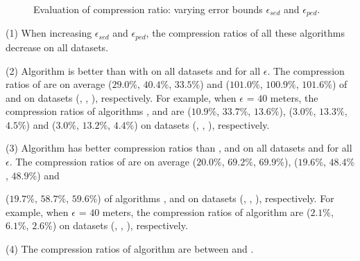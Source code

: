 {\begin{figure}[tb!]
	\caption{\small Evaluation of compression ratio: varying error bounds $\epsilon_{sed}$ and $\epsilon_{ped}$.}
	\label{fig:compression-ratio}
\end{figure}


\ni (1) When increasing $\epsilon_{sed}$ and $\epsilon_{ped}$, the compression ratios of all these algorithms decrease on all datasets.

\ni (2) Algorithm \citt is better than  with \grts on all datasets and for all $\epsilon$.
The compression ratios of \citt are on average {($29.0\%$, $40.4\%$, $33.5\%$) and ($101.0\%$, $100.9\%$, $101.6\%$)} of \ldrh and
\grts on {datasets (\mopsi, \sercar, \geolife)}, respectively.
For example, when $\epsilon$ = $40$ meters, the compression ratios of algorithms
\ldrh, \citt and \grts are
{($10.9\%$, $33.7\%$, $13.6\%$), ($3.0\%$, $13.3\%$, $4.5\%$) and ($3.0\%$, $13.2\%$, $4.4\%$)} on  {datasets (\mopsi, \sercar, \geolife)}, respectively.

\ni (3) Algorithm \sitt has better compression ratios than \ldrh, \citt and \grts on all datasets and for all $\epsilon$.
The compression ratios of \sitt are on average ($20.0\%$, $69.2\%$, $69.9\%$), ($19.6\%$, $48.4\%$, $48.9\%$) and {($19.7\%$, $58.7\%$, $59.6\%$) of algorithms
	\ldrh, \citt and \grts on {datasets (\mopsi, \sercar, \geolife)}, respectively.
	For example, when $\epsilon$ = $40$ meters, the compression ratios of algorithm
	\sitt are ($2.1\%$, $6.1\%$, $2.6\%$) on datasets (\mopsi, \sercar, \geolife), respectively.
	
	\ni (4) The compression ratios of algorithm \bitt are between \citt and \sitt.







}}
